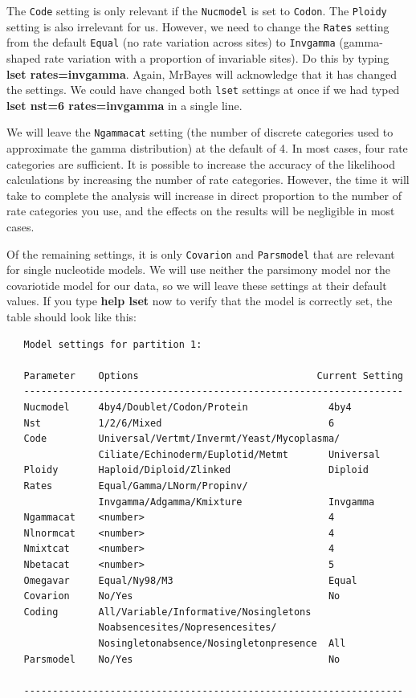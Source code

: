 \documentclass[12pt]{book}
\begin{document}
The \texttt{Code} setting is only relevant if the \texttt{Nucmodel} is set to \texttt{Codon}.
 The \texttt{Ploidy} setting is also irrelevant for us. However, we need to change the \texttt{Rates}
 setting from the default \texttt{Equal} (no rate variation across sites) to \texttt{Invgamma}
 (gamma-shaped rate variation with a proportion of invariable sites). Do this by typing
 \textbf{lset rates=invgamma}. Again, MrBayes will acknowledge that it has changed the settings. We could
 have changed both \texttt{lset} settings at once if we had typed \textbf{lset nst=6 rates=invgamma} in a
 single line.

We will leave the \texttt{Ngammacat} setting (the number of discrete categories used to approximate the
 gamma distribution) at the default of 4. In most cases, four rate categories are sufficient. It is
 possible to increase the accuracy of the likelihood calculations by increasing the number of rate
 categories. However, the time it will take to complete the analysis will increase in direct proportion
 to the number of rate categories you use, and the effects on the results will be negligible in most cases.

Of the remaining settings, it is only \texttt{Covarion} and \texttt{Parsmodel} that are relevant for single
 nucleotide models. We will use neither the parsimony model nor the covariotide model for our data, so we
 will leave these settings at their default values. If you type \textbf{help lset} now to verify that the
 model is correctly set, the table should look like this:

\begin{singlespacing}
\small
\begin{verbatim}
   Model settings for partition 1:

   Parameter    Options                               Current Setting
   ------------------------------------------------------------------
   Nucmodel     4by4/Doublet/Codon/Protein              4by4
   Nst          1/2/6/Mixed                             6
   Code         Universal/Vertmt/Invermt/Yeast/Mycoplasma/
                Ciliate/Echinoderm/Euplotid/Metmt       Universal
   Ploidy       Haploid/Diploid/Zlinked                 Diploid
   Rates        Equal/Gamma/LNorm/Propinv/
                Invgamma/Adgamma/Kmixture               Invgamma
   Ngammacat    <number>                                4
   Nlnormcat    <number>                                4
   Nmixtcat     <number>                                4
   Nbetacat     <number>                                5
   Omegavar     Equal/Ny98/M3                           Equal
   Covarion     No/Yes                                  No
   Coding       All/Variable/Informative/Nosingletons
                Noabsencesites/Nopresencesites/
                Nosingletonabsence/Nosingletonpresence  All
   Parsmodel    No/Yes                                  No

   ------------------------------------------------------------------
\end{verbatim}
\normalsize
\end{singlespacing}
\end{document}
